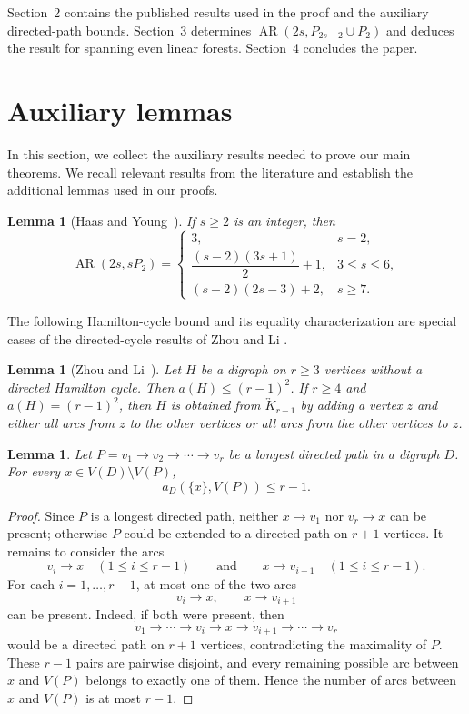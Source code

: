 \documentclass[10pt,a4paper]{article}
\newtheorem{lemma}[theorem]{Lemma}
\DeclareMathOperator{\AR}{AR}
\newcommand{\sK}{\overleftrightarrow{K}}
\begin{document}
Section~2 contains the published results used in the proof and the
auxiliary directed-path bounds. Section~3 determines $\AR(2s,P_{2s-2}\cup P_2)$
and deduces the result for spanning even linear forests. Section~4
concludes the paper.

\section{Auxiliary lemmas}

In this section, we collect the auxiliary results needed to prove our main theorems. We recall relevant results from the literature and establish the additional lemmas used in our proofs.

\begin{lemma}[Haas and Young~\cite{HY}]
\label{lem:HY} If $s\geq2$ is an integer, then 
\[
\AR(2s,sP_2)=
 \begin{cases}
  3,&s=2,\\[1mm]
  \dfrac{(s-2)(3s+1)}{2}+1,&3\le s\le6,\\[2mm]
  (s-2)(2s-3)+2,&s\ge7.
 \end{cases}
\]
\end{lemma}

The following Hamilton-cycle bound and its equality characterization are
special cases of the directed-cycle results of Zhou and Li \cite{ZL}.

\begin{lemma}[Zhou and Li~\cite{ZL}]\label{lem:cycle-density}
Let $H$ be a digraph on $r\ge3$ vertices without a directed Hamilton cycle.
Then $a(H)\le(r-1)^2$. If $r\ge4$ and $a(H)=(r-1)^2$, then $H$ is obtained
from $\sK_{r-1}$ by adding a vertex $z$ and either all arcs from $z$ to
the other vertices or all arcs from the other vertices to $z$.
\end{lemma}


\begin{lemma}\label{lem:insertion}
Let $P=v_1\to v_2\to\cdots\to v_r$ be a longest directed path in a
digraph $D$. For every $x\in V(D)\setminus V(P)$,
\[
 a_D(\{x\},V(P))\le r-1.
\]
\end{lemma}

\begin{proof}
	Since \(P\) is a longest directed path, neither \(x\to v_1\) nor
	\(v_r\to x\) can be present; otherwise \(P\) could be extended to a
	directed path on \(r+1\) vertices.
	It remains to consider the arcs
	\[
	v_i\to x \quad (1\le i\le r-1)
	\qquad\text{and}\qquad
	x\to v_{i+1} \quad (1\le i\le r-1).
	\]
	For each \(i=1,\ldots,r-1\), at most one of the two arcs
	\[
	v_i\to x,\qquad x\to v_{i+1}
	\]
	can be present. Indeed, if both were present, then
	\[
	v_1\to\cdots\to v_i\to x\to v_{i+1}\to\cdots\to v_r
	\]
	would be a directed path on \(r+1\) vertices, contradicting the maximality
	of \(P\).	
	These \(r-1\) pairs are pairwise disjoint, and every remaining possible
	arc between \(x\) and \(V(P)\) belongs to exactly one of them. Hence the
	number of arcs between \(x\) and \(V(P)\) is at most \(r-1\).
\end{proof}
\end{document}
